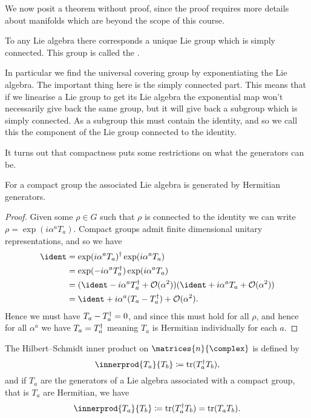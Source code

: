 We now posit a theorem without proof, since the proof requires more details about manifolds which are beyond the scope of this course.
\begin{thm}{}{}
    To any Lie algebra there corresponds a unique Lie group which is simply connected.
    This group is called the .
\end{thm}
In particular we find the universal covering group by exponentiating the Lie algebra.
The important thing here is the simply connected part.
This means that if we linearise a Lie group to get its Lie algebra the exponential map won't necessarily give back the same group, but it will give back a subgroup which is simply connected.
As a subgroup this must contain the identity, and so we call this the component of the Lie group connected to the identity.

It turns out that compactness puts some restrictions on what the generators can be.
\begin{thm}{}{}
    For a compact group the associated Lie algebra is generated by Hermitian generators.
    \begin{proof}
        Given some \(\rho \in G\) such that \(\rho\) is connected to the identity we can write \(\rho = \exp(i\alpha^aT_a)\).
        Compact groups admit finite dimensional unitary representations, and so we have
        \begin{align}
            \ident &= \exp(i\alpha^aT_a)^\hermit \exp(i\alpha^aT_a)\\
            &= \exp(-i\alpha^aT_a^\hermit)\exp(i\alpha^aT_a)\\
            &= (\ident - i\alpha^aT_a^\hermit + \order(\alpha^2))(\ident + i\alpha^aT_a + \order(\alpha^2))\\
            &= \ident + i\alpha^a(T_a - T_a^\hermit) + \order(\alpha^2).
        \end{align}
        Hence we must have \(T_a - T_a^\dagger = 0\), and since this must hold for all \(\rho\), and hence for all \(\alpha^a\) we have \(T_a = T_a^\dagger\) meaning \(T_a\) is Hermitian individually for each \(a\).
    \end{proof}
\end{thm}

\begin{crl}{}{}
    The Hilbert--Schmidt inner product on \(\matrices{n}{\complex}\) is defined by
    \begin{equation}
        \innerprod{T_a}{T_b} \coloneqq \tr(T_a^\hermit T_b),
    \end{equation}
    and if \(T_a\) are the generators of a Lie algebra associated with a compact group, that is \(T_a\) are Hermitian, we have
    \begin{equation}
        \innerprod{T_a}{T_b} \coloneqq \tr(T_a^\hermit T_b) = \tr(T_aT_b).
    \end{equation}
\end{crl}

